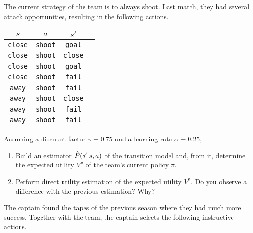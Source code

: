 \documentclass[11pt, a4paper]{article}
\begin{document}
The current strategy of the team is to always shoot. Last match, they had several attack opportunities, resulting in the following actions.

\begin{table}[H]
    \centering
    \begin{tabular}{cccc}
        \toprule
         $s$ & $a$ & $s'$ \\
         \midrule
         \texttt{close} & \texttt{shoot} & \texttt{goal} \\
         \texttt{close} & \texttt{shoot} & \texttt{close} \\
         \texttt{close} & \texttt{shoot} & \texttt{goal} \\
         \texttt{close} & \texttt{shoot} & \texttt{fail} \\
         \texttt{away} & \texttt{shoot} & \texttt{fail} \\
         \texttt{away} & \texttt{shoot} & \texttt{close} \\
         \texttt{away} & \texttt{shoot} & \texttt{fail} \\
         \texttt{away} & \texttt{shoot} & \texttt{fail} \\
         \bottomrule
    \end{tabular}
\end{table}

Assuming a discount factor $\gamma = 0.75$ and a learning rate $\alpha = 0.25$,

\begin{enumerate}
    \item Build an estimator $\hat{P}(s' \vert s, a)$ of the transition model and, from it, determine the expected utility $V^\pi$ of the team's current policy $\pi$.

    \item Perform direct utility estimation of the expected utility $V^\pi$. Do you observe a difference with the previous estimation? Why?
\end{enumerate}

The captain found the tapes of the previous season where they had much more success. Together with the team, the captain selects the following instructive actions.
\end{document}
